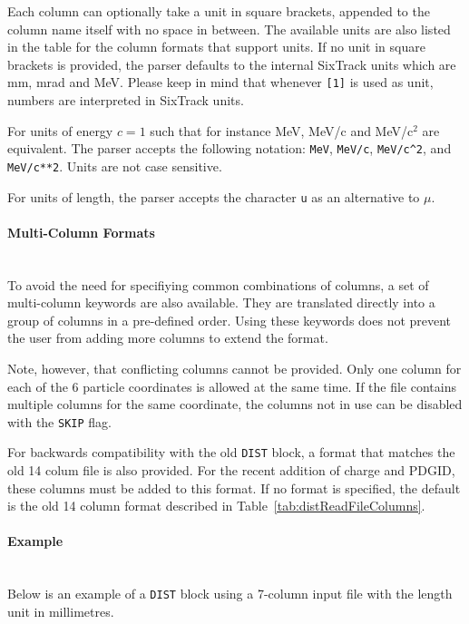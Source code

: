 Each column can optionally take a unit in square brackets, appended to the column name itself with no space in between.
The available units are also listed in the table for the column formats that support units.
If no unit in square brackets is provided, the parser defaults to the internal SixTrack units which are mm, mrad and MeV.
Please keep in mind that whenever \texttt{[1]} is used as unit, numbers are interpreted in SixTrack units.

For units of energy $c=1$ such that for instance MeV, MeV/c and MeV/c$^2$ are equivalent.
The parser accepts the following notation: \texttt{MeV}, \texttt{MeV/c}, \texttt{MeV/c\^{}2}, and \texttt{MeV/c**2}.
Units are not case sensitive.

For units of length, the parser accepts the character \texttt{u} as an alternative to $\mu$.

\paragraph{Multi-Column Formats}~\\

To avoid the need for specifiying common combinations of columns, a set of multi-column keywords are also available.
They are translated directly into a group of columns in a pre-defined order.
Using these keywords does not prevent the user from adding more columns to extend the format.

Note, however, that conflicting columns cannot be provided.
Only one column for each of the 6 particle coordinates is allowed at the same time.
If the file contains multiple columns for the same coordinate, the columns not in use can be disabled with the \texttt{SKIP} flag.

For backwards compatibility with the old \texttt{DIST} block, a format that matches the old 14 colum file is also provided.
For the recent addition of charge and PDGID, these columns must be added to this format.
If no format is specified, the default is the old 14 column format described in Table~\ref{tab:distReadFileColumns}.

\paragraph{Example}~\\

Below is an example of a \texttt{DIST} block using a 7-column input file with the length unit in millimetres.

